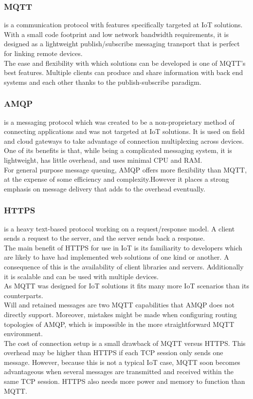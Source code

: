 \subsubsection{MQTT} is a communication protocol with features specifically targeted at IoT solutions. With a small code footprint and low network bandwidth requirements, it is designed as a lightweight publish/subscribe messaging transport that is perfect for linking remote devices.\\
The ease and flexibility with which solutions can be developed is one of MQTT's best features. Multiple clients can produce and share information with back end systems and each other thanks to the publish-subscribe paradigm.

\subsubsection{AMQP} is a messaging protocol which was created to be a non-proprietary method of connecting applications and was not targeted at IoT solutions. It is used on field and cloud gateways to take advantage of connection multiplexing across devices. One of its benefits is that, while being a complicated messaging system, it is lightweight, has little overhead, and uses minimal CPU and RAM. \\
For general purpose message queuing, AMQP offers more flexibility than MQTT, at the expense of some efficiency and complexity.However it places a strong emphasis on message delivery that adds to the overhead eventually.

\subsubsection{HTTPS} is a heavy text-based protocol working on a request/response model. A client sends a request to the server, and the server sends back a response.\\
The main benefit of HTTPS for use in IoT is its familiarity to developers which are likely to have had implemented web solutions of one kind or another. A consequence of this is the availability of client libraries and servers. Additionally it is scalable and can be used with multiple devices.\\


As MQTT was designed for IoT solutions it fits many more IoT scenarios than its counterparts. \\
Will and retained messages are two MQTT capabilities that AMQP does not directly support. Moreover, mistakes might be made when configuring routing topologies of AMQP, which is impossible in the more straightforward MQTT environment.\\
The cost of connection setup is a small drawback of MQTT versus HTTPS. This overhead may be higher than HTTPS if each TCP session only sends one message. However, because this is not a typical IoT case, MQTT soon becomes advantageous when several messages are transmitted and received within the same TCP session. HTTPS also needs more power and memory to function than MQTT.\\

